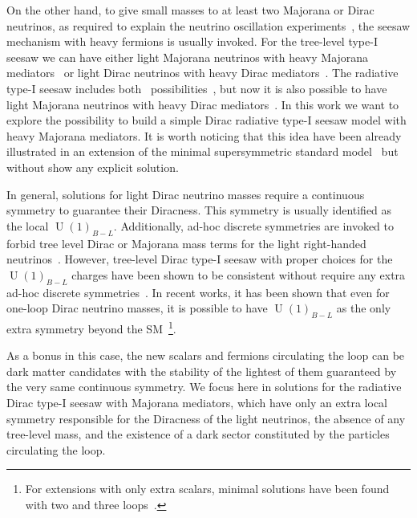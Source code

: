 \documentclass[12pt]{article}
\begin{document}
On the other hand, to give small masses to at least two Majorana or
Dirac neutrinos, as required to explain the neutrino oscillation
experiments~\cite{Ahmad:2002jz, Fukuda:1998mi},
the seesaw mechanism with heavy fermions is usually invoked.
For the tree-level type-I seesaw we can have either light Majorana
neutrinos with heavy Majorana
mediators~\cite{Minkowski:1977sc,Yanagida:1979as,GellMann:1980vs,Mohapatra:1979ia}
or light Dirac neutrinos with heavy Dirac
mediators~\cite{Roncadelli:1983ty,Roy:1983be,Gu:2007mc,Ma:2014qra}.
The radiative type-I seesaw includes both~\cite{Ma:2006km}
possibilities~\cite{Farzan:2012sa},
but now it is also possible to have light Majorana neutrinos with
heavy Dirac mediators~\cite{Ma:2013yga}.
In this work we want to explore the possibility to build a simple
Dirac radiative type-I seesaw model with heavy Majorana mediators.
It is worth noticing that this idea have been already illustrated in
an extension of the minimal supersymmetric standard
model~\cite{Demir:2007dt} but without show any explicit solution.

In general, solutions for light Dirac neutrino masses require a
continuous symmetry to guarantee their Diracness. This symmetry is
usually identified as the local $\operatorname{U}(1)_{B-L}$.
Additionally, ad-hoc discrete symmetries are invoked to forbid tree
level Dirac or Majorana mass terms for the light right-handed
neutrinos~\cite{Roncadelli:1983ty,Han:2018zcn,Wang:2017mcy}.
However, tree-level Dirac type-I seesaw with proper choices for the
$\operatorname{U}(1)_{B-L}$ charges have been shown to be consistent
without require any extra ad-hoc discrete symmetries~\cite{Ma:2014qra}.
In recent works, it has been shown that even for one-loop Dirac
neutrino masses, it is possible to have $\operatorname{U}(1)_{B-L}$ as
the only extra symmetry beyond the SM~\cite{Calle:2018ovc,Bonilla:2018ynb,Saad:2019bqf}\footnote{
  For extensions with only extra scalars, minimal solutions have been found with two and three loops~\cite{Saad:2019bqf}.}.

As a bonus in this case, the new scalars and fermions circulating the
loop can be dark matter candidates with the stability of the lightest
of them guaranteed by the very same continuous symmetry.
We focus here in solutions for the radiative Dirac type-I seesaw with
Majorana mediators, which have only an extra local symmetry responsible for the
Diracness of the light neutrinos, the absence of any tree-level
mass, and the existence of a dark sector constituted by the
particles circulating the loop.
\end{document}
